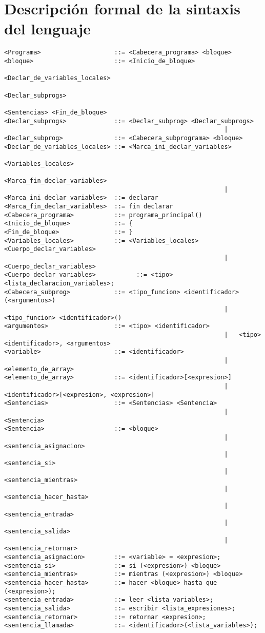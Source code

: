 \section{Descripción formal de la sintaxis del lenguaje}

\begin{verbatim}
<Programa>                    ::= <Cabecera_programa> <bloque>
<bloque>                      ::= <Inicio_de_bloque>
																	<Declar_de_variables_locales>					
																	<Declar_subprogs>
																	<Sentencias> <Fin_de_bloque>
<Declar_subprogs>             ::= <Declar_subprog> <Declar_subprogs>
															|
<Declar_subprog>              ::= <Cabecera_subprograma> <bloque>
<Declar_de_variables_locales> ::= <Marca_ini_declar_variables>
																	<Variables_locales>
																	<Marca_fin_declar_variables>
															|
<Marca_ini_declar_variables>  ::= declarar
<Marca_fin_declar_variables>  ::= fin declarar
<Cabecera_programa>           ::= programa_principal()
<Inicio_de_bloque>            ::= {
<Fin_de_bloque>               ::= }
<Variables_locales>           ::= <Variables_locales> <Cuerpo_declar_variables>
															| 	<Cuerpo_declar_variables>
<Cuerpo_declar_variables>			::= <tipo> <lista_declaracion_variables>;
<Cabecera_subprog>            ::= <tipo_funcion> <identificador>(<argumentos>)
															| 	<tipo_funcion> <identificador>()
<argumentos>                  ::= <tipo> <identificador>
															| 	<tipo> <identificador>, <argumentos>
<variable>                    ::= <identificador>
															| 	<elemento_de_array>
<elemento_de_array>           ::= <identificador>[<expresion>]
															| 	<identificador>[<expresion>, <expresion>]
<Sentencias>                  ::= <Sentencias> <Sentencia>
															| 	<Sentencia>
<Sentencia>                   ::= <bloque>
															| 	<sentencia_asignacion>
															| 	<sentencia_si>
															| 	<sentencia_mientras>
															| 	<sentencia_hacer_hasta>
															| 	<sentencia_entrada>
															| 	<sentencia_salida>
															| 	<sentencia_retornar>
<sentencia_asignacion>        ::= <variable> = <expresion>;
<sentencia_si>                ::= si (<expresion>) <bloque>
<sentencia_mientras>          ::= mientras (<expresion>) <bloque>
<sentencia_hacer_hasta>       ::= hacer <bloque> hasta que (<expresion>);
<sentencia_entrada>           ::= leer <lista_variables>;
<sentencia_salida>            ::= escribir <lista_expresiones>;
<sentencia_retornar>          ::= retornar <expresion>;
<sentencia_llamada>           ::= <identificador>(<lista_variables>);

\end{verbatim}
